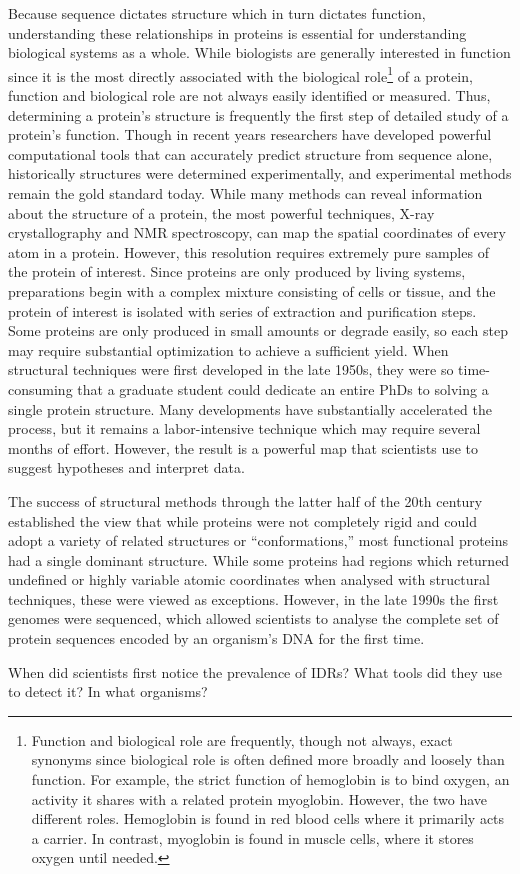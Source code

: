 Because sequence dictates structure which in turn dictates function, understanding these relationships in proteins is essential for understanding biological systems as a whole. While biologists are generally interested in function since it is the most directly associated with the biological role\footnote{Function and biological role are frequently, though not always, exact synonyms since biological role is often defined more broadly and loosely than function. For example, the strict function of hemoglobin is to bind oxygen, an activity it shares with a related protein myoglobin. However, the two have different roles. Hemoglobin is found in red blood cells where it primarily acts a carrier. In contrast, myoglobin is found in muscle cells, where it stores oxygen until needed.} of a protein, function and biological role are not always easily identified or measured. Thus, determining a protein's structure is frequently the first step of detailed study of a protein's function. Though in recent years researchers have developed powerful computational tools that can accurately predict structure from sequence alone, historically structures were determined experimentally, and experimental methods remain the gold standard today. While many methods can reveal information about the structure of a protein, the most powerful techniques, X-ray crystallography and NMR spectroscopy, can map the spatial coordinates of every atom in a protein. However, this resolution requires extremely pure samples of the protein of interest. Since proteins are only produced by living systems, preparations begin with a complex mixture consisting of cells or tissue, and the protein of interest is isolated with series of extraction and purification steps. Some proteins are only produced in small amounts or degrade easily, so each step may require substantial optimization to achieve a sufficient yield. When structural techniques were first developed in the late 1950s, they were so time-consuming that a graduate student could dedicate an entire PhDs to solving a single protein structure. Many developments have substantially accelerated the process, but it remains a labor-intensive technique which may require several months of effort. However, the result is a powerful map that scientists use to suggest hypotheses and interpret data.

The success of structural methods through the latter half of the 20th century established the view that while proteins were not completely rigid and could adopt a variety of related structures or ``conformations,'' most functional proteins had a single dominant structure. While some proteins had regions which returned undefined or highly variable atomic coordinates when analysed with structural techniques, these were viewed as exceptions. However, in the late 1990s the first genomes were sequenced, which allowed scientists to analyse the complete set of protein sequences encoded by an organism's DNA for the first time.

When did scientists first notice the prevalence of IDRs?
What tools did they use to detect it?
In what organisms?